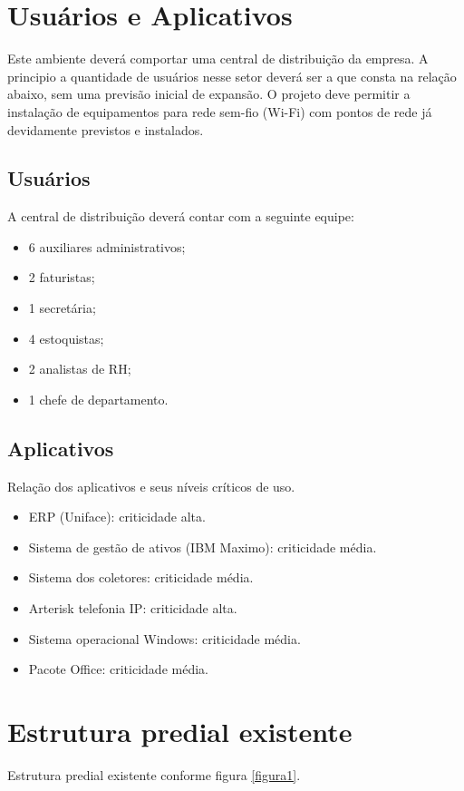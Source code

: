 \documentclass[	DIV=calc,%
							paper=a4,%
							fontsize=12pt,%
							onecolumn]{scrartcl}	 					%
\begin{document}
\section{Usuários e Aplicativos}
Este ambiente deverá comportar uma central de distribuição da empresa. A principio a quantidade de usuários nesse setor deverá ser a que consta na relação abaixo, sem uma previsão inicial de expansão. O projeto deve permitir a instalação de equipamentos para rede sem-fio (Wi-Fi) com pontos de rede já devidamente previstos e instalados. 


\subsection{Usuários}
A central de distribuição deverá contar com a seguinte equipe:
\\
\begin{itemize}

	\item 6 auxiliares administrativos;
	\item 2 faturistas;
	\item 1 secretária;
	\item 4 estoquistas;
	\item 2 analistas de RH;
	\item 1 chefe de departamento.
		
\end{itemize}

\subsection{Aplicativos}
Relação dos aplicativos e seus níveis críticos de uso.
\\
\begin{itemize}

	\item ERP (Uniface): criticidade alta. 
	\item Sistema de gestão de ativos (IBM Maximo): criticidade média.
	\item Sistema dos coletores: criticidade média. 
	\item Arterisk telefonia IP: criticidade alta. 
	\item Sistema operacional Windows: criticidade média.  
	\item Pacote Office: criticidade média. 
\end{itemize}


\section{Estrutura predial existente}
Estrutura predial existente conforme figura \ref{figura1}. 
\end{document}
